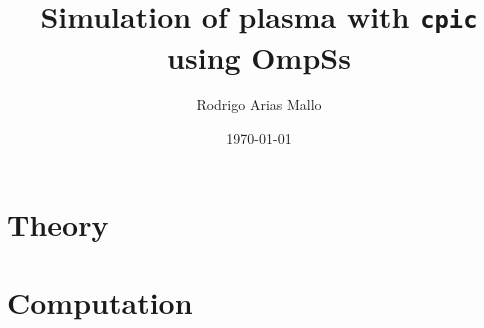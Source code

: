 \documentclass[a4paper,12pt]{book}
\title{Simulation of plasma with \texttt{cpic} using OmpSs}
\author{Rodrigo Arias Mallo}
\date{\today}
\begin{document}
\maketitle
\tableofcontents




\part{Theory}




\part{Computation}







%
%



\end{document}
